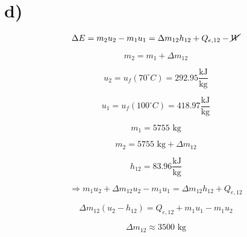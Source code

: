 

\section*{d)}

\[
\Delta E = m_2 u_2 - m_1 u_1 = \Delta m_{12} h_{12} + Q_{e,12} - \cancel{W}
\]

\[
m_2 = m_1 + \Delta m_{12}
\]

\[
u_2 = u_f (70^\circ C) = 292.95 \frac{\text{kJ}}{\text{kg}}
\]

\[
u_1 = u_f (100^\circ C) = 418.97 \frac{\text{kJ}}{\text{kg}}
\]

\[
m_1 = 5755 \text{ kg}
\]

\[
m_2 = 5755 \text{ kg} + \Delta m_{12}
\]

\[
h_{12} = 83.96 \frac{\text{kJ}}{\text{kg}}
\]

\[
\Rightarrow m_1 u_2 + \Delta m_{12} u_2 - m_1 u_1 = \Delta m_{12} h_{12} + Q_{e,12}
\]

\[
\Delta m_{12} (u_2 - h_{12}) = Q_{e,12} + m_1 u_1 - m_1 u_2
\]

\[
\Delta m_{12} \approx 3500 \text{ kg}
\]